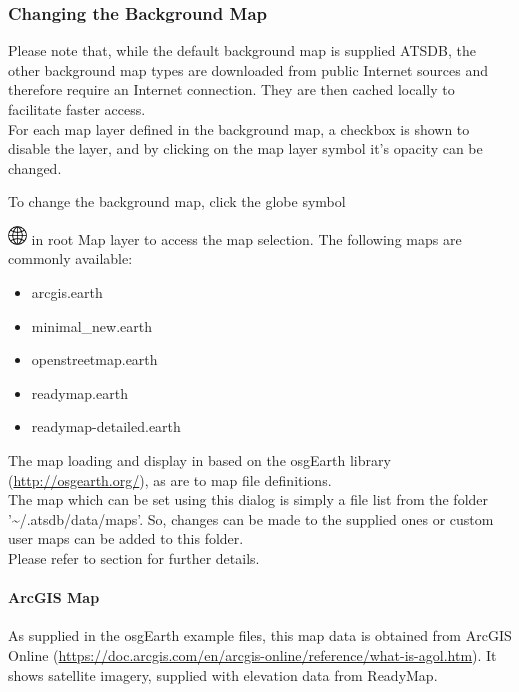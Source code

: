 \subsubsection{Changing the Background Map}

Please note that, while the default background map is supplied ATSDB, the other background map types are downloaded from public Internet sources and therefore require an Internet connection. They are then cached locally to facilitate faster access. \\

For each map layer defined in the background map, a checkbox is shown to disable the layer, and by clicking on the map layer symbol it's opacity can be changed.

To change the background map, click the globe symbol {\includegraphics[width=0.5cm]{../../data/icons/globe.png} in root Map layer to access the map selection. The following maps are commonly available:

\begin{itemize}
 \item arcgis.earth
 \item minimal\_new.earth
 \item openstreetmap.earth
 \item readymap.earth
 \item readymap-detailed.earth
\end{itemize}

The map loading and display in based on the osgEarth library (\url{http://osgearth.org/}), as are to map file definitions.  \\

The map which can be set using this dialog is simply a file list from the folder '\textasciitilde/.atsdb/data/maps'. So, changes can be made to the supplied ones or custom user maps can be added to this folder. \\
Please refer to section  for further details.

\newpage
\paragraph{ArcGIS Map}

As supplied in the osgEarth example files, this map data is obtained from ArcGIS Online (\url{https://doc.arcgis.com/en/arcgis-online/reference/what-is-agol.htm}). It shows satellite imagery, supplied with elevation data from ReadyMap. 

}

